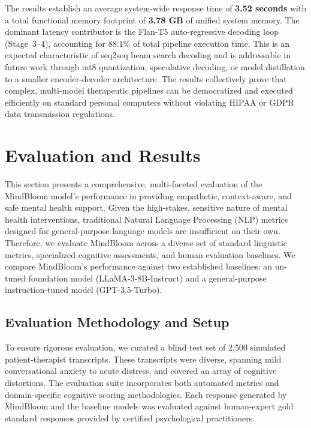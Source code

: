 \documentclass[12pt,twoside]{article}
\begin{document}
\medskip
The results establish an average system-wide response time of \textbf{3.52 seconds} with a total functional memory footprint of \textbf{3.78 GB} of unified system memory. The dominant latency contributor is the Flan-T5 auto-regressive decoding loop (Stage~3--4), accounting for 88.1\% of total pipeline execution time. This is an expected characteristic of seq2seq beam search decoding and is addressable in future work through int8 quantization, speculative decoding, or model distillation to a smaller encoder-decoder architecture. The results collectively prove that complex, multi-model therapeutic pipelines can be democratized and executed efficiently on standard personal computers without violating HIPAA or GDPR data transmission regulations.

\section{Evaluation and Results}

This section presents a comprehensive, multi-faceted evaluation of the MindBloom model's performance in providing empathetic, context-aware, and safe mental health support. Given the high-stakes, sensitive nature of mental health interventions, traditional Natural Language Processing (NLP) metrics designed for general-purpose language models are insufficient on their own. Therefore, we evaluate MindBloom across a diverse set of standard linguistic metrics, specialized cognitive assessments, and human evaluation baselines. We compare MindBloom's performance against two established baselines: an un-tuned foundation model (LLaMA-3-8B-Instruct) and a general-purpose instruction-tuned model (GPT-3.5-Turbo).

\subsection{Evaluation Methodology and Setup}

To ensure rigorous evaluation, we curated a blind test set of 2,500 simulated patient-therapist transcripts. These transcripts were diverse, spanning mild conversational anxiety to acute distress, and covered an array of cognitive distortions. The evaluation suite incorporates both automated metrics and domain-specific cognitive scoring methodologies. Each response generated by MindBloom and the baseline models was evaluated against human-expert gold standard responses provided by certified psychological practitioners.
\end{document}
